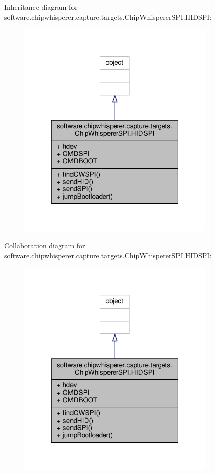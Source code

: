 Inheritance diagram for software.\+chipwhisperer.\+capture.\+targets.\+Chip\+Whisperer\+S\+P\+I.\+H\+I\+D\+S\+P\+I\+:\nopagebreak
\begin{figure}[H]
\begin{center}
\leavevmode
\includegraphics[width=268pt]{d0/db8/classsoftware_1_1chipwhisperer_1_1capture_1_1targets_1_1ChipWhispererSPI_1_1HIDSPI__inherit__graph}
\end{center}
\end{figure}


Collaboration diagram for software.\+chipwhisperer.\+capture.\+targets.\+Chip\+Whisperer\+S\+P\+I.\+H\+I\+D\+S\+P\+I\+:\nopagebreak
\begin{figure}[H]
\begin{center}
\leavevmode
\includegraphics[width=268pt]{d6/d66/classsoftware_1_1chipwhisperer_1_1capture_1_1targets_1_1ChipWhispererSPI_1_1HIDSPI__coll__graph}
\end{center}
\end{figure}



